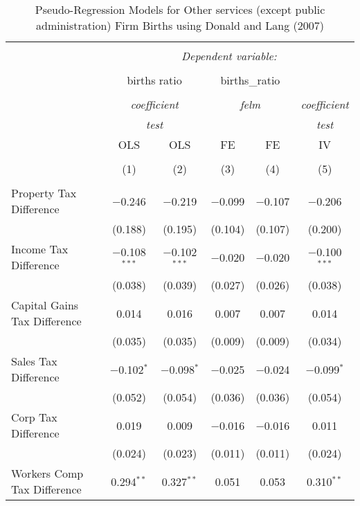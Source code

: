 
\begin{table}[!htbp] \centering 
  \caption{Pseudo-Regression Models for  Other services (except public administration) Firm Births using Donald and Lang (2007)} 
  \label{} 
\begin{tabular}{@{\extracolsep{5pt}}lccccc} 
\\[-1.8ex]\hline 
\hline \\[-1.8ex] 
 & \multicolumn{5}{c}{\textit{Dependent variable:}} \\ 
\cline{2-6} 
\\[-1.8ex] & \multicolumn{2}{c}{births ratio} & \multicolumn{2}{c}{births\_ratio} &   \\ 
\\[-1.8ex] & \multicolumn{2}{c}{\textit{coefficient}} & \multicolumn{2}{c}{\textit{felm}} & \textit{coefficient} \\ 
 & \multicolumn{2}{c}{\textit{test}} & \multicolumn{2}{c}{\textit{}} & \textit{test} \\ 
 & OLS & OLS & FE & FE & IV \\ 
\\[-1.8ex] & (1) & (2) & (3) & (4) & (5)\\ 
\hline \\[-1.8ex] 
 Property Tax Difference & $-$0.246 & $-$0.219 & $-$0.099 & $-$0.107 & $-$0.206 \\ 
  & (0.188) & (0.195) & (0.104) & (0.107) & (0.200) \\ 
  Income Tax Difference & $-$0.108$^{***}$ & $-$0.102$^{***}$ & $-$0.020 & $-$0.020 & $-$0.100$^{***}$ \\ 
  & (0.038) & (0.039) & (0.027) & (0.026) & (0.038) \\ 
  Capital Gains Tax Difference & 0.014 & 0.016 & 0.007 & 0.007 & 0.014 \\ 
  & (0.035) & (0.035) & (0.009) & (0.009) & (0.034) \\ 
  Sales Tax Difference & $-$0.102$^{*}$ & $-$0.098$^{*}$ & $-$0.025 & $-$0.024 & $-$0.099$^{*}$ \\ 
  & (0.052) & (0.054) & (0.036) & (0.036) & (0.054) \\ 
  Corp Tax Difference & 0.019 & 0.009 & $-$0.016 & $-$0.016 & 0.011 \\ 
  & (0.024) & (0.023) & (0.011) & (0.011) & (0.024) \\ 
  Workers Comp Tax Difference & 0.294$^{**}$ & 0.327$^{**}$ & 0.051 & 0.053 & 0.310$^{**}$ \\ 

\end{tabular}
\end{table}
